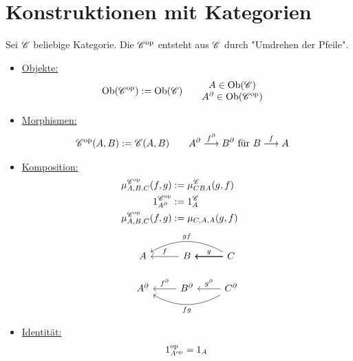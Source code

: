 
\chapter{Konstruktionen mit Kategorien}

\begin{definition}\enter
	Sei $\mathscr C$ beliebige Kategorie.
	Die  $\mathscr C^{\text{op}}$ entsteht aus $\mathscr C$ durch "Umdrehen der Pfeile".
	\begin{itemize}
		\item \ul{Objekte:}
			\begin{align*}
				\operatorname{Ob}(\mathscr C^{\text{op}})&:=\operatorname{Ob}(\mathscr C)\qquad\begin{matrix}
						A\in\operatorname{Ob}(\mathscr C)\\
						A^\partial\in\operatorname{Ob}(\mathscr C^{\text{op}})
						\end{matrix}
			\end{align*}
		\item \ul{Morphismen:}
			\begin{align*}
				\mathscr C^{\text{op}}(A,B)&:=\mathscr C(A,B)\qquad
						A^\partial\overset{f^\partial}{\longrightarrow}B^\partial\text{ für }B\overset{f}{\longrightarrow}A
			\end{align*}
		\item \ul{Komposition:}
			\begin{align*}
				\mu_{A,B,C}^{\mathscr C^{\text{op}}}(f,g)&:=\mu_{CBA}^\mathscr C(g,f)\qquad\\
				1_{A^\partial}^{\mathscr C^{\text{op}}}&:=1_A^\mathscr C\\
				\mu_{A,B,C}^{\mathscr C^{\text{op}}}(f,g) &:= \mu_{C,A,A}(g,f)\\
			\end{align*}
		\begin{align*}
				\begin{tikzcd}[ampersand replacement=\&]
					A \& B \arrow[l, "f"'] \& C \arrow[l, "g"'] \arrow[l] \arrow[l] \arrow[ll, "gf"', bend right]\\
					A^{\partial} \& B^{\partial} \arrow[l, "f^{\partial}"'] \& C^{\partial} \arrow[l, "g^{\partial}"'] \arrow[ll, "fg", bend left]
				\end{tikzcd}
			\end{align*}
		\item \ul{Identität:}
			\begin{align*}
				1_{A^{\text{op}}}^{\text{op}} = 1_A
			\end{align*}
	\end{itemize}
\end{definition}

